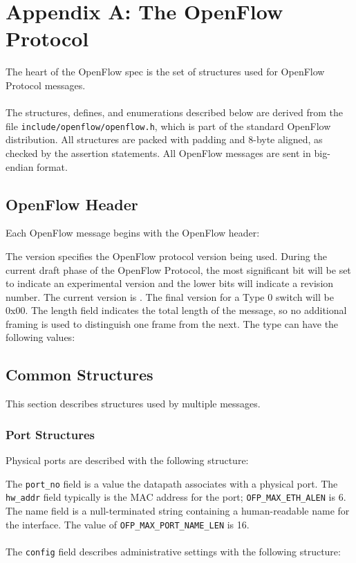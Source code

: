 \section{Appendix A: The OpenFlow Protocol}
The heart of the OpenFlow spec is the set of structures used for OpenFlow Protocol messages.  
\\\\
The structures, defines, and enumerations described below are derived from the file \verb|include/openflow/openflow.h|, which is part of the standard OpenFlow distribution.  All structures are packed with padding and 8-byte aligned, as checked by the assertion statements.  All OpenFlow messages are sent in big-endian format.  

\subsection{OpenFlow Header}
Each OpenFlow message begins with the OpenFlow header:


The version specifies the OpenFlow protocol version being used.  During the current draft phase of the OpenFlow Protocol, the most significant bit will be set to indicate an experimental version and the lower bits will indicate a revision number.  The current version is .  The final version for a Type 0 switch will be 0x00.  The length field indicates the total length of the message, so no additional framing is used to distinguish one frame from the next.  The type can have the following values:



\subsection{Common Structures}
This section describes structures used by multiple messages.

\subsubsection{Port Structures}
Physical ports are described with the following structure:


The \verb|port_no| field is a value the datapath associates with a physical port.  The \verb|hw_addr| field typically is the MAC address for the port; \verb|OFP_MAX_ETH_ALEN| is 6.  The name field is a null-terminated string containing a human-readable name for the interface.  The value of \verb|OFP_MAX_PORT_NAME_LEN| is 16.  
\\\\
The \verb|config| field describes administrative settings with the following structure:

